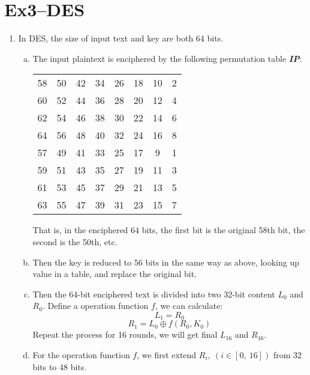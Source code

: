 \documentclass[12pt, a4paper]{article}
\begin{document}
\section{Ex3--DES}
\begin{enumerate}
      \item In DES, the size of input text and key are both 64 bits.
            \begin{enumerate}[a)]
                  \item The input plaintext is enciphered by the following permutation table \textbf{\emph{IP}}:
                        \begin{center}
                              \begin{tabular}{cccccccc}
                                    58 & 50 & 42 & 34 & 26 & 18 & 10 & 2\\
                                    60 & 52 & 44 & 36 & 28 & 20 & 12 & 4\\
                                    62 & 54 & 46 & 38 & 30 & 22 & 14 & 6\\
                                    64 & 56 & 48 & 40 & 32 & 24 & 16 & 8\\
                                    57 & 49 & 41 & 33 & 25 & 17 & 9  & 1\\
                                    59 & 51 & 43 & 35 & 27 & 19 & 11 & 3\\
                                    61 & 53 & 45 & 37 & 29 & 21 & 13 & 5\\
                                    63 & 55 & 47 & 39 & 31 & 23 & 15 & 7
                              \end{tabular}
                        \end{center}
                        That is, in the enciphered 64 bits, the first bit is the original 58th bit, the second is the 50th, etc.\newline
                  \item Then the key is reduced to 56 bits in the same way as above, looking up value in a table, 
                        and replace the original bit.
                  \item Then the 64-bit enciphered text is divided into two 32-bit content $L_0$ and $R_0$. Define a operation function $f$, 
                        we can calculate:
                        $$L_1 = R_0$$
                        $$R_1 = L_0 \oplus f(R_0, K_0)$$
                        Repeat the process for 16 rounds, we will get final $L_{16}$ and $R_{16}$.
                  \item For the operation function $f$, we first extend $R_i,\ (i \in [0,\ 16])$ from 32 bits to 48 bits. 

\end{enumerate}
\end{enumerate}
\end{document}
